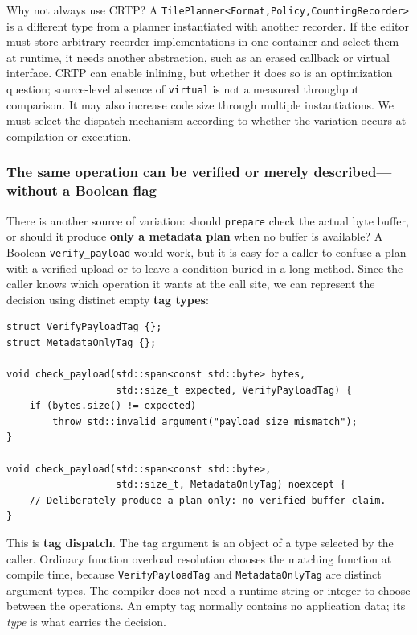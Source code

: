 Why not always use CRTP? A \texttt{TilePlanner\textless{}Format,Policy,CountingRecorder\textgreater{}} is a different type from a planner instantiated with another recorder. If the editor must store arbitrary recorder implementations in one container and select them at runtime, it needs another abstraction, such as an erased callback or virtual interface. CRTP can enable inlining, but whether it does so is an optimization question; source-level absence of \texttt{virtual} is not a measured throughput comparison. It may also increase code size through multiple instantiations. We must select the dispatch mechanism according to whether the variation occurs at compilation or execution.

\subsubsection{The same operation can be verified or merely described---without a Boolean flag}\label{the-same-operation-can-be-verified-or-merely-describedwithout-a-boolean-flag}

There is another source of variation: should \texttt{prepare} check the actual byte buffer, or should it produce \textbf{only a metadata plan} when no buffer is available? A Boolean \texttt{verify\_payload} would work, but it is easy for a caller to confuse a plan with a verified upload or to leave a condition buried in a long method. Since the caller knows which operation it wants at the call site, we can represent the decision using distinct empty \textbf{tag types}:

\begin{verbatim}
struct VerifyPayloadTag {};
struct MetadataOnlyTag {};

void check_payload(std::span<const std::byte> bytes,
                   std::size_t expected, VerifyPayloadTag) {
    if (bytes.size() != expected)
        throw std::invalid_argument("payload size mismatch");
}

void check_payload(std::span<const std::byte>,
                   std::size_t, MetadataOnlyTag) noexcept {
    // Deliberately produce a plan only: no verified-buffer claim.
}
\end{verbatim}

This is \textbf{tag dispatch}. The tag argument is an object of a type selected by the caller. Ordinary function overload resolution chooses the matching function at compile time, because \texttt{VerifyPayloadTag} and \texttt{MetadataOnlyTag} are distinct argument types. The compiler does not need a runtime string or integer to choose between the operations. An empty tag normally contains no application data; its \emph{type} is what carries the decision.


